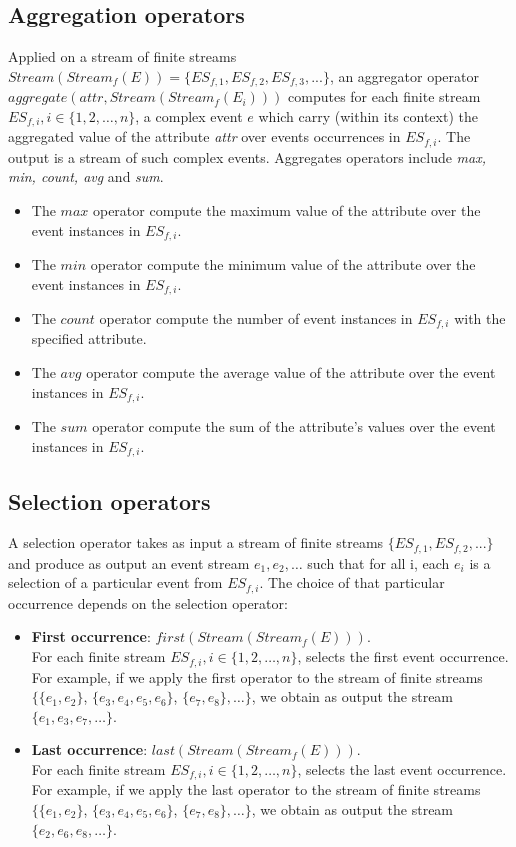 \subsection{Aggregation operators}
Applied on a stream of finite streams $Stream(Stream_f(E))= \{ES_{f,1}, ES_{f,2}, ES_{f,3}, ...\}$, an aggregator operator $aggregate(attr, Stream(Stream_f(E_i)))$ computes for each finite stream $ES_{f,i}, i \in \{1, 2, …, n\}$, a complex event $e$ which carry (within its context) the aggregated value of the attribute \textit{attr} over events occurrences in $ES_{f,i}$. The output is a stream of such complex events. Aggregates operators include \textit{max, min, count, avg} and \textit{sum}. 
\begin{itemize}
 \item The $max$ operator compute the maximum value of the attribute over the event instances in $ES_{f,i}$.
 \item The $min$ operator compute the minimum value of the attribute over the event instances in $ES_{f,i}$.
 \item The $count$ operator compute the number of event instances in $ES_{f,i}$ with the specified attribute.
 \item The $avg$ operator compute the average value of the attribute over the event instances in $ES_{f,i}$.
 \item The $sum$ operator compute the sum of the attribute's values over the event instances in $ES_{f,i}$.
\end{itemize}

\subsection{Selection operators}
A selection operator takes as input a stream of finite streams $\{ES_{f,1}, ES_{f,2},...\}$ and produce as output an event stream ${e_1, e_2, … }$ such that for all i, each $e_i$ is a selection of a particular event from $ES_{f,i}$. The choice of that particular occurrence depends on the selection operator: %
\begin{itemize}
 \item \textbf{ First occurrence}: $first (Stream(Stream_f(E)))$. \\
For each finite stream $ES_{f,i}, i \in \{1, 2, …, n\}$, selects the first event occurrence. For example, if we apply the first operator to the stream of finite streams $\{\{e_1, e_2\}$, $\{ e_3, e_4, e_5, e_6\}$, $\{ e_7, e_8\},…\}$, we obtain as output the stream $\{e_1, e_3, e_7, …\}$.
   \item \textbf{Last occurrence}: $last (Stream(Stream_f(E)))$. \\
For each finite stream $ES_{f,i}, i \in \{1, 2, …, n\}$, selects the last event occurrence. For example, if we apply the last operator to the stream of finite streams $\{\{e_1, e_2\}$, $\{ e_3, e_4, e_5, e_6\}$, $\{ e_7, e_8\},…\}$, we obtain as output the stream $\{e_2, e_6, e_8, …\}$.
\end{itemize}
